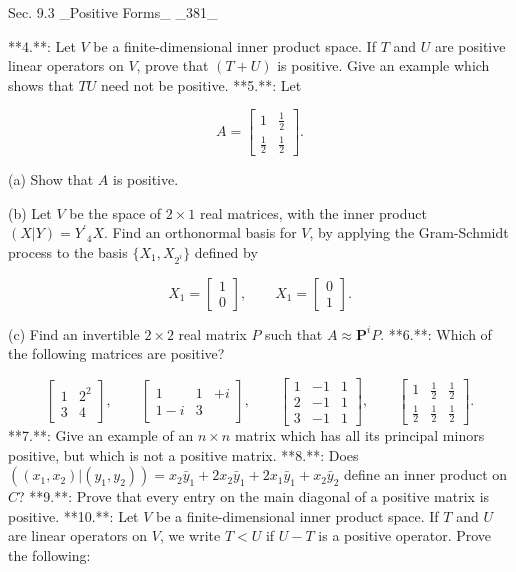 Sec. 9.3 _Positive Forms_ _381_

**4.**: Let \(V\) be a finite-dimensional inner product space. If \(T\) and \(U\) are positive linear operators on \(V\), prove that \((T+U)\) is positive. Give an example which shows that \(TU\) need not be positive.
**5.**: Let

\[A=\begin{bmatrix}1&\frac{1}{2}\\ \frac{1}{2}&\frac{1}{2}\end{bmatrix}.\]

(a) Show that \(A\) is positive.

(b) Let \(V\) be the space of \(2\times 1\) real matrices, with the inner product \((X|Y)=Y^{\prime}{}_{4}X\). Find an orthonormal basis for \(V\), by applying the Gram-Schmidt process to the basis \(\{X_{1},X_{2^{i}}\}\) defined by

\[X_{1}=\begin{bmatrix}1\\ 0\end{bmatrix},\qquad X_{1}=\begin{bmatrix}0\\ 1\end{bmatrix}.\]

(c) Find an invertible \(2\times 2\) real matrix \(P\) such that \(A\approx\boldsymbol{P}^{i}P\).
**6.**: Which of the following matrices are positive?

\[\begin{bmatrix}1&2^{2}\\ 3&4\end{bmatrix},\qquad\begin{bmatrix}1&1&+i\\ 1-i&3\end{bmatrix},\qquad\begin{bmatrix}1&-1&1\\ 2&-1&1\\ 3&-1&1\end{bmatrix},\qquad\begin{bmatrix}1&\frac{1}{2}&\frac{1}{2}\\ \frac{1}{2}&\frac{1}{2}&\frac{1}{2}\end{bmatrix}.\]
**7.**: Give an example of an \(n\times n\) matrix which has all its principal minors positive, but which is not a positive matrix.
**8.**: Does \(((x_{1},x_{2})|(y_{1},y_{2}))=x_{2}\bar{y}_{1}+2x_{2}\bar{y}_{1}+2x_{1}\bar{y} _{1}+x_{2}\bar{y}_{2}\) define an inner product on \(C\)?
**9.**: Prove that every entry on the main diagonal of a positive matrix is positive.
**10.**: Let \(V\) be a finite-dimensional inner product space. If \(T\) and \(U\) are linear operators on \(V\), we write \(T<U\) if \(U-T\) is a positive operator. Prove the following:

